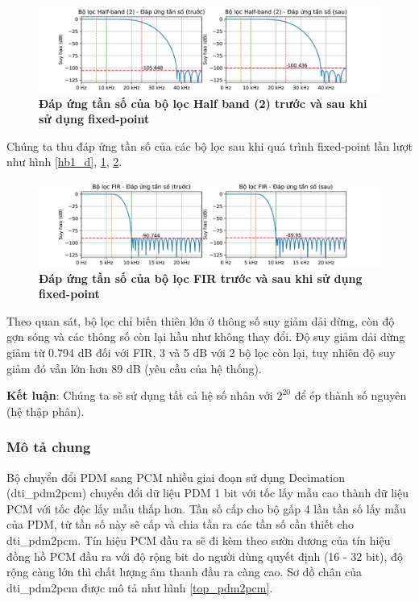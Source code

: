 \begin{figure}[H]
    \centering
    \includegraphics[width=17.5cm]{Images/Chuong4/hb2.png}
    \caption[Đáp ứng tần số của bộ lọc Half band (2) trước và sau khi sử dụng fixed-point]{\bfseries \fontsize{12pt}{0pt}\selectfont Đáp ứng tần số của bộ lọc Half band (2) trước và sau khi sử dụng fixed-point}
    \label{hb2_d}
\end{figure}
Chúng ta thu đáp ứng tần số của các bộ lọc sau khi quá trình fixed-point lần lượt như hình \ref{hb1_d}, \ref{hb2_d}, \ref{fir_d}.
\begin{figure}[H]
    \centering
    \includegraphics[width=17.5cm]{Images/Chuong4/fir.png}
    \caption[Đáp ứng tần số của bộ lọc FIR trước và sau khi sử dụng fixed-point]{\bfseries \fontsize{12pt}{0pt}\selectfont Đáp ứng tần số của bộ lọc FIR trước và sau khi sử dụng fixed-point}
    \label{fir_d}
\end{figure}



Theo quan sát, bộ lọc chỉ biến thiên lớn ở thông số suy giảm dải dừng, còn độ gợn sóng và các thông số còn lại hầu như không thay đổi. Độ suy giảm dải dừng giảm từ 0.794 dB đối với FIR, 3 và 5 dB với 2 bộ lọc còn lại, tuy nhiên độ suy giảm đó vẫn lớn hơn 89 dB (yêu cầu của hệ thống).

\textbf{Kết luận}: Chúng ta sẽ sử dụng tất cả hệ số nhân với $2^{20}$ để ép thành số nguyên (hệ thập phân).
\subsubsection{Mô tả chung}
Bộ chuyển đổi PDM sang PCM nhiều giai đoạn sử dụng Decimation (dti\_pdm2pcm) chuyển đổi dữ liệu PDM 1 bit với tốc lấy mẫu cao thành dữ liệu PCM với  tốc độc lấy mẫu thấp hơn. Tần số cấp cho bộ gấp 4 lần tần số lấy mẫu của PDM, từ tần số này sẽ cấp và chia tần ra các tần số cần thiết cho dti\_pdm2pcm. Tín hiệu PCM đầu ra sẽ đi kèm theo sườn dương của tín hiệu đồng hồ PCM đầu ra với độ rộng bit do người dùng quyết định (16 - 32 bit), độ rộng càng lớn thì chất lượng âm thanh đầu ra càng cao. Sơ đồ chân của dti\_pdm2pcm được mô tả như hình \ref{top_pdm2pcm}.

